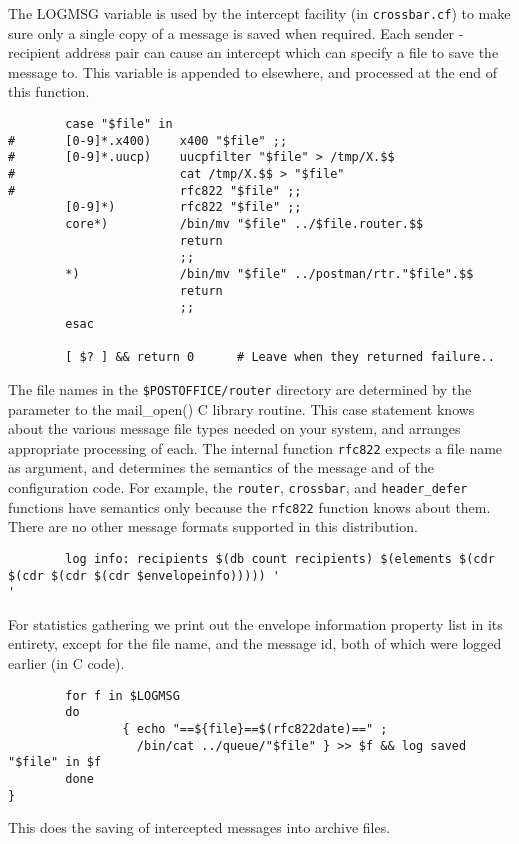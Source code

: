 The LOGMSG variable is used by the intercept facility (in {\tt crossbar.cf})
to make sure only a single copy of a message is saved when required.
Each sender - recipient address pair can cause an intercept which can
specify a file to save the message to.  This variable is appended to
elsewhere, and processed at the end of this function.
\begin{verbatim}
        case "$file" in
#       [0-9]*.x400)    x400 "$file" ;;
#       [0-9]*.uucp)    uucpfilter "$file" > /tmp/X.$$
#                       cat /tmp/X.$$ > "$file"
#                       rfc822 "$file" ;;
        [0-9]*)         rfc822 "$file" ;;
        core*)          /bin/mv "$file" ../$file.router.$$
                        return
                        ;;
        *)              /bin/mv "$file" ../postman/rtr."$file".$$
                        return
                        ;;
        esac

        [ $? ] && return 0      # Leave when they returned failure..
\end{verbatim}

The file names in the {\tt \$POSTOFFICE/router} directory are determined by
the parameter to the mail\_open() C library routine.  This case
statement knows about the various message file types needed on your
system, and arranges appropriate processing of each.  The internal
function {\tt rfc822} expects a file name as argument, and determines the
semantics of the message and of the configuration code.  For example,
the {\tt router}, {\tt crossbar}, and {\tt header\_defer} functions have semantics only
because the {\tt rfc822} function knows about them.  There are no other
message formats supported in this distribution.
\begin{verbatim}
        log info: recipients $(db count recipients) $(elements $(cdr $(cdr $(cdr $(cdr $envelopeinfo))))) '
'
\end{verbatim}

For statistics gathering we print out the envelope information property
list in its entirety, except for the file name, and the message id, both
of which were logged earlier (in C code).
\begin{verbatim}
        for f in $LOGMSG
        do
                { echo "==${file}==$(rfc822date)==" ;
                  /bin/cat ../queue/"$file" } >> $f && log saved "$file" in $f
        done
}
\end{verbatim}

This does the saving of intercepted messages into archive files.



